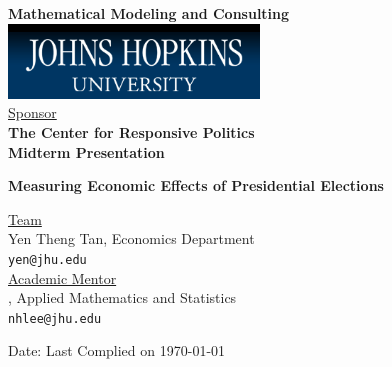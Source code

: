 \documentclass[oneside,12pt]{report}
\begin{document}
\def\thefootnote{\fnsymbol{footnote}}

\thispagestyle{empty}

\def\shiftdowna{0.32in}  %
\def\shiftdownb{0.22in}  %


\begin{center}
\textbf{{\large Mathematical Modeling and Consulting }}\\

\vspace \shiftdowna
\includegraphics[width=0.5\textwidth]{jhu.png}\\

\vspace \shiftdowna
\underline {Sponsor}\\ 
\vspace{5pt}
\textbf{\large The Center for Responsive Politics} \\
\vspace\shiftdowna
\textbf{{Midterm Presentation}}

\vspace \shiftdowna
\textbf{{\Large Measuring Economic Effects of Presidential Elections}}

\vspace{0.35in}
\underline {Team}\\
\vspace{5pt}
Yen Theng Tan, Economics Department\\
\texttt{yen@jhu.edu} \\

\vspace \shiftdownb
\underline {Academic Mentor} \\
\vspace{5pt}
, Applied Mathematics and Statistics\\
\texttt{nhlee@jhu.edu}


\vspace \shiftdowna
Date: Last Complied on \today

\end{center}
\end{document}
